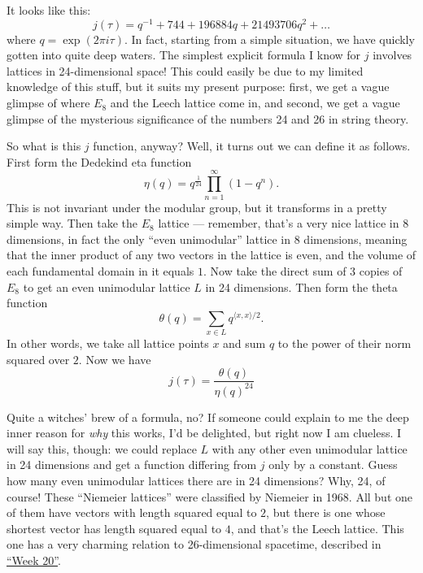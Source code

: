 \documentclass{article}
\begin{document}
It looks like this:
\[j(\tau) = q^{-1} + 744 + 196884 q + 21493706 q^2 + \ldots\] where
\(q = \exp(2\pi i\tau)\). In fact, starting from a simple situation, we
have quickly gotten into quite deep waters. The simplest explicit
formula I know for \(j\) involves lattices in 24-dimensional space! This
could easily be due to my limited knowledge of this stuff, but it suits
my present purpose: first, we get a vague glimpse of where \(E_8\) and
the Leech lattice come in, and second, we get a vague glimpse of the
mysterious significance of the numbers 24 and 26 in string theory.

So what is this \(j\) function, anyway? Well, it turns out we can define
it as follows. First form the Dedekind eta function
\[\eta(q) = q^{\frac{1}{24}}\prod_{n=1}^\infty(1-q^n).\] This is not
invariant under the modular group, but it transforms in a pretty simple
way. Then take the \(E_8\) lattice --- remember, that's a very nice
lattice in 8 dimensions, in fact the only ``even unimodular'' lattice in
8 dimensions, meaning that the inner product of any two vectors in the
lattice is even, and the volume of each fundamental domain in it equals
\(1\). Now take the direct sum of 3 copies of \(E_8\) to get an even
unimodular lattice \(L\) in 24 dimensions. Then form the theta function
\[\theta(q) = \sum_{x\in L}q^{\langle x,x\rangle/2}.\] In other words,
we take all lattice points \(x\) and sum \(q\) to the power of their
norm squared over \(2\). Now we have
\[j(\tau) = \frac{\theta(q)}{\eta(q)^24}\]

Quite a witches' brew of a formula, no? If someone could explain to me
the deep inner reason for \emph{why} this works, I'd be delighted, but
right now I am clueless. I will say this, though: we could replace \(L\)
with any other even unimodular lattice in 24 dimensions and get a
function differing from \(j\) only by a constant. Guess how many even
unimodular lattices there are in 24 dimensions? Why, 24, of course!
These ``Niemeier lattices'' were classified by Niemeier in 1968. All but
one of them have vectors with length squared equal to \(2\), but there
is one whose shortest vector has length squared equal to \(4\), and
that's the Leech lattice. This one has a very charming relation to
26-dimensional spacetime, described in \protect\hyperlink{week20}{``Week
20''}.
\end{document}
